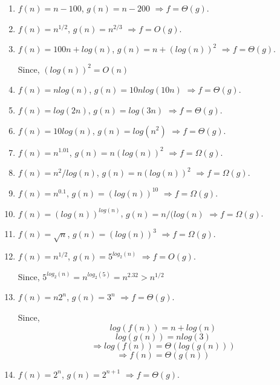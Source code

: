 \documentclass[11pt]{article}
\begin{document}
	
	\begin{enumerate}[label=(\alph*)]
		\item $f(n) = n - 100$, $g(n) = n - 200$ $\Rightarrow f = \Theta(g)$.
		
		\item $f(n) = n^{1/2}$, $g(n) = n^{2/3}$ $\Rightarrow f = O(g)$.
		
		\item $f(n) = 100n + log(n)$, $g(n) = n + (log(n))^2$ $\Rightarrow f = \Theta(g)$.
		
		Since, $(log(n))^2 = O(n)$
		
		\item $f(n) = nlog(n)$, $g(n) = 10nlog(10n)$ $\Rightarrow f = \Theta(g)$.
		
		\item $f(n) = log(2n)$, $g(n) = log(3n)$ $\Rightarrow f = \Theta(g)$.
		
		\item $f(n) = 10log(n)$, $g(n) = log(n^2)$ $\Rightarrow f = \Theta(g)$.
		
		\item $f(n) = n^{1.01}$, $g(n) = n(log(n))^2$ $\Rightarrow f = \Omega(g)$.
		
		\item $f(n) = n^2/log(n)$, $g(n) = n(log(n))^2$ $\Rightarrow f = \Omega(g)$.
		
		\item $f(n) = n^{0.1}$, $g(n) = (log(n))^{10}$ $\Rightarrow f = \Omega(g)$.
		
		\item $f(n) = (log(n))^{log(n)}$, $g(n) = n/(log(n)$ $\Rightarrow f = \Omega(g)$.
		
		\item $f(n) = \sqrt{n}$, $g(n) = (log(n))^3$ $\Rightarrow f = \Omega(g)$.
		
		\item $f(n) = n^{1/2}$, $g(n) = 5^{log_2(n)}$ $\Rightarrow f = O(g)$.
		
		Since, $5^{log_2(n)} = n^{log_2(5)} = n^{2.32} > n^{1/2}$
		
		\item $f(n) = n2^n$, $g(n) = 3^n$ $\Rightarrow f = \Theta(g)$.
		
		Since, $$log(f(n)) = n + log(n)$$
		$$log(g(n)) = nlog(3)$$ 
		$$\Rightarrow log(f(n)) = \Theta(log(g(n)))$$
		$$\Rightarrow f(n) = \Theta(g(n))$$
		
		\item $f(n) = 2^n$, $g(n) = 2^{n+1}$ $\Rightarrow f = \Theta(g)$.
		

\end{enumerate}
\end{document}
